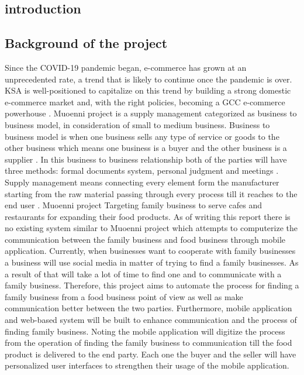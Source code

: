 \documentclass[11pt]{article}
\newcommand\tab[1][1cm]{\hspace*{#1}}
\begin{document}
\newpage

\listoffigures


\newpage

\setcounter{page}{8}
\begin{center}
\section{introduction}
\end{center}

\subsection{Background of the project}



\tab Since the COVID-19 pandemic began, e-commerce has grown at an unprecedented rate, a trend that is likely to continue once the pandemic is over. KSA is well-positioned to capitalize on this trend by building a strong domestic e-commerce market and, with the right policies, becoming a GCC e-commerce powerhouse \cite{50bEcommerce}. Muoenni project is a supply management categorized as business to business model, in consideration of small to medium business. Business to business model is when one business sells any type of service or goods to the other business which means one business is a buyer and the other business is a supplier \cite{B2BModel}. In this business to business relationship both of the parties will have three methods: formal documents system, personal judgment and meetings \cite{ManagingB2B}. Supply management means connecting every element form the manufacturer starting from the raw material passing through every process till it reaches to the end user \cite{FRMsupplychain}. Muoenni project Targeting family business to serve cafes and restaurants for expanding their food products. As of writing this report there is no existing system similar to Muoenni project which attempts to computerize the communication between the family business and food business through mobile application. Currently, when businesses want to cooperate with family businesses a business will use social media in matter of trying to find a family businesses. As a result of that will take a lot of time to find one and to communicate with a family business. Therefore, this project aims to automate the process for finding a family business from a food business point of view as well as make communication better between the two parties. Furthermore, mobile application and web-based system will be built to enhance communication and  the process of finding family business. Noting the mobile application will digitize the process from the operation of finding the family business to communication till the food product is delivered to the end party. Each one the buyer and the seller will have personalized user interfaces to strengthen their usage of the mobile application.
      
\end{document}
